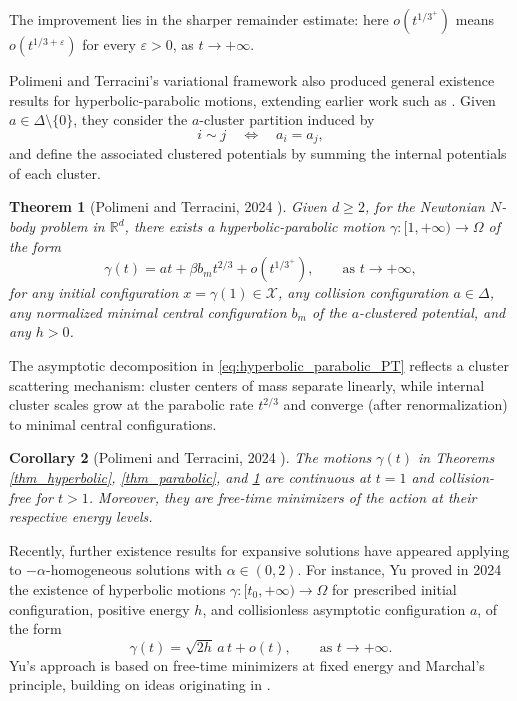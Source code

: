 \documentclass[a4paper,10pt]{amsart}
\theoremstyle{plain}
\newtheorem{thm}{Theorem}
\newtheorem{cor}[thm]{Corollary}
\theoremstyle{definition}
\numberwithin{equation}{section}
\numberwithin{thm}{section}
\begin{document}
The improvement lies in the sharper remainder estimate: here $o(t^{1/3^+})$ means $o(t^{1/3+\varepsilon})$ for every $\varepsilon>0$, as $t\to+\infty$.

Polimeni and Terracini's variational framework also produced general existence results for hyperbolic-parabolic motions, extending earlier work such as \cite{Burgos_PartiallyHyperbolic}. Given $a\in\Delta\setminus\{0\}$, they consider the $a$-cluster partition induced by
\begin{equation}\label{eq:equivalence_relation}
i\sim j\quad\Longleftrightarrow\quad a_i=a_j,
\end{equation}
and define the associated clustered potentials by summing the internal potentials of each cluster.

\begin{thm}[Polimeni and Terracini, 2024 \cite{PolimeniTerracini}]\label{thm_partially_hyperbolic}
Given $d\ge 2$, for the Newtonian $N$-body problem in $\mathbb{R}^d$, there exists a hyperbolic-parabolic motion $\gamma:[1,+\infty)\to\Omega$ of the form
\begin{equation}\label{eq:hyperbolic_parabolic_PT}
\gamma(t)=at+\beta b_m t^{2/3}+o(t^{1/3^+}),
\qquad\text{as }t\to+\infty,
\end{equation}
for any initial configuration $x=\gamma(1)\in\mathcal{X}$, any collision configuration $a\in\Delta$, any normalized minimal central configuration $b_m$ of the $a$-clustered potential, and any $h>0$.
\end{thm}

The asymptotic decomposition in \eqref{eq:hyperbolic_parabolic_PT} reflects a cluster scattering mechanism: cluster centers of mass separate linearly, while internal cluster scales grow at the parabolic rate $t^{2/3}$ and converge (after renormalization) to minimal central configurations.

\begin{cor}[Polimeni and Terracini, 2024 \cite{PolimeniTerracini}]
The motions $\gamma(t)$ in Theorems \ref{thm_hyperbolic}, \ref{thm_parabolic}, and \ref{thm_partially_hyperbolic} are continuous at $t=1$ and collision-free for $t>1$. Moreover, they are free-time minimizers of the action at their respective energy levels.
\end{cor}

Recently, further existence results for expansive solutions have appeared applying to $-\alpha$-homogeneous solutions with $\alpha\in(0,2)$. For instance, Yu \cite{Yu_Hyperbolic} proved in 2024 the existence of hyperbolic motions $\gamma:[t_0,+\infty)\to\Omega$ for prescribed initial configuration, positive energy $h$, and collisionless asymptotic configuration $a$, of the form
\begin{equation}\label{eq:Yu_hyperbolic}
\gamma(t)=\sqrt{2h}\,a\,t+o(t),
\qquad\text{as }t\to+\infty.
\end{equation}
Yu's approach is based on free-time minimizers at fixed energy and Marchal's principle, building on ideas originating in \cite{LiuYanZhou}.
\medskip
\end{document}
